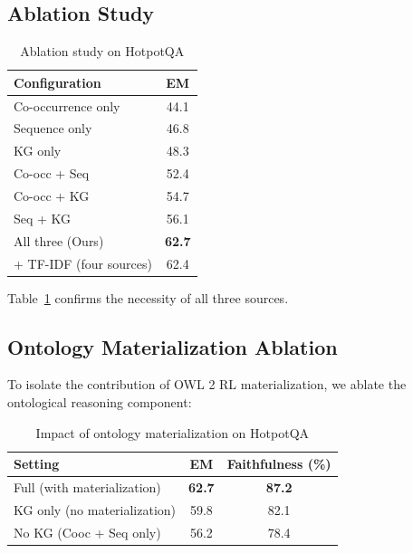 \documentclass[10pt,twocolumn]{article}
\begin{document}
\subsection{Ablation Study}

\begin{table}[t]
\centering
\caption{Ablation study on HotpotQA}
\label{tab:ablation}
\small
\begin{tabular}{@{}lc@{}}
\toprule
\textbf{Configuration} & \textbf{EM} \\
\midrule
Co-occurrence only & 44.1 \\
Sequence only & 46.8 \\
KG only & 48.3 \\
\midrule
Co-occ + Seq & 52.4 \\
Co-occ + KG & 54.7 \\
Seq + KG & 56.1 \\
\midrule
All three (Ours) & \textbf{62.7} \\
+ TF-IDF (four sources) & 62.4 \\
\bottomrule
\end{tabular}
\end{table}

Table~\ref{tab:ablation} confirms the necessity of all three sources.


\subsection{Ontology Materialization Ablation}
\label{sec:materialization_ablation}

To isolate the contribution of OWL 2 RL materialization, we ablate the ontological reasoning component:

\begin{table}[h]
\centering
\caption{Impact of ontology materialization on HotpotQA}
\label{tab:materialization}
\small
\begin{tabular}{@{}lcc@{}}
\toprule
\textbf{Setting} & \textbf{EM} & \textbf{Faithfulness (\%)} \\
\midrule
Full (with materialization) & \textbf{62.7} & \textbf{87.2} \\
KG only (no materialization) & 59.8 & 82.1 \\
No KG (Cooc + Seq only) & 56.2 & 78.4 \\
\bottomrule
\end{tabular}
\end{table}
\end{document}
